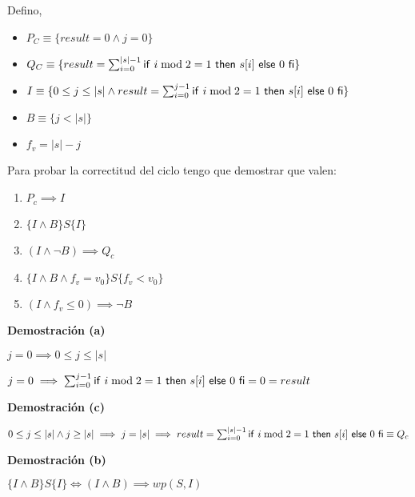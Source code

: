 Defino,
\begin{itemize}
    \item $ P_C \equiv \{ result = 0 \wedge j = 0 \} $
    \item $ Q_C \equiv \{ result = \sum_{i=0}^{|s|-1}\mathsf{if}\ i \bmod 2 = 1\ \mathsf{then}\ s[i]\ \mathsf{else}\ 0\ \mathsf{fi} \} $
    \item $ I \equiv \{ 0 \leq j \leq |s| \wedge result = \sum_{i=0}^{j-1}\mathsf{if}\ i \bmod 2 = 1\ \mathsf{then}\ s[i]\ \mathsf{else}\ 0\ \mathsf{fi} \} $
    \item $ B \equiv \{ j < |s| \} $
    \item $ f_v = |s| - j $
\end{itemize}

Para probar la correctitud del ciclo tengo que demostrar que valen:
\begin{enumerate}[label=(\alph*)]
    \item $ P_c \implies I $
    \item $ \{ I \wedge B \} S \{ I \} $
    \item $ (I \wedge \neg B) \implies Q_c $
    \item $ \{ I \wedge B \wedge f_v = v_0 \} S \{ f_v < v_0 \} $
    \item $ (I \wedge f_v \leq 0) \implies \neg B $
\end{enumerate}

\textbf{Demostración (a)}

$ j = 0 \implies 0 \leq j \leq |s| $

$ j = 0 \implies \sum_{i=0}^{j-1}\mathsf{if}\ i \bmod 2 = 1\ \mathsf{then}\ s[i]\ \mathsf{else}\ 0\ \mathsf{fi} = 0 = result $

\textbf{Demostración (c)}

$ 0 \leq j \leq |s| \wedge j \geq |s| \implies j = |s| \implies result = \sum_{i=0}^{|s|-1}\mathsf{if}\ i \bmod 2 = 1\ \mathsf{then}\ s[i]\ \mathsf{else}\ 0\ \mathsf{fi} \equiv Q_c $

\textbf{Demostración (b)}

$ \{ I \wedge B \} S \{ I \} \iff (I \wedge B) \implies wp(S, I) $

